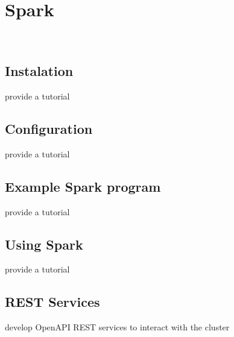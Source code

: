 \chapter{Spark}

\FILENAME\


\section{Instalation}

\begin{exercise}
provide a tutorial 
\end{exercise}

\section{Configuration}

\begin{exercise}
provide a tutorial 
\end{exercise}

\section{Example Spark program}

\begin{exercise}
provide a tutorial 
\end{exercise}

\section{Using Spark}

\begin{exercise}
provide a tutorial 
\end{exercise}

\section{REST Services}

\begin{exercise}
develop OpenAPI REST services to interact with the cluster
\end{exercise}
